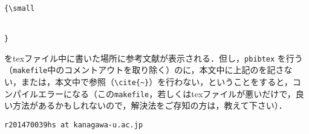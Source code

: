 \documentclass[10pt,twocolumn]{jarticle}
\begin{document}
\begin{verbatim}
{\small


}
\end{verbatim}
をtexファイル中に書いた場所に参考文献が表示される．但し，\verb|pbibtex| を行う（\verb|makefile|中のコメントアウトを取り除く）のに，本文中に上記の\verb||を記さない，または，本文中で参照（\verb|\cite{~}|）を行わない，ということをすると，コンパイルエラーになる（この\verb|makefile|，若しくはtexファイルが悪いだけで，良い方法があるかもしれないので，解決法をご存知の方は，教えて下さい）．\par
\noindent \verb|r201470039hs at kanagawa-u.ac.jp|
\end{document}
